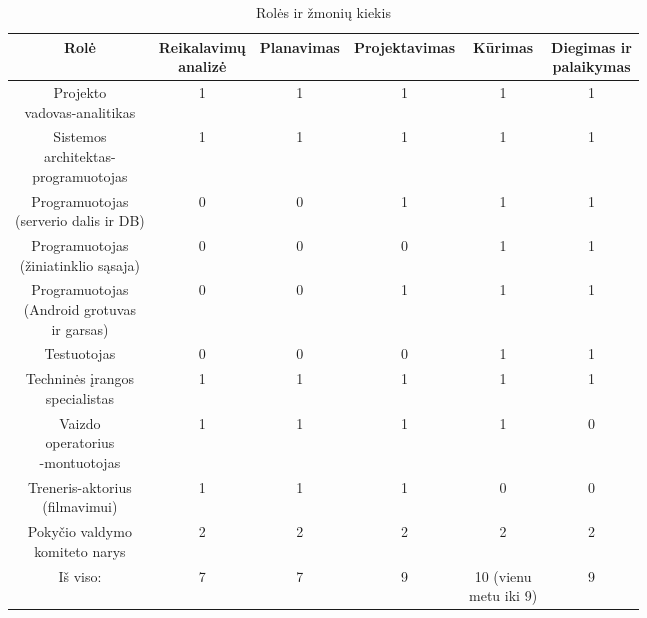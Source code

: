 \begin{table}[h]
    \centering
    \small
    \begin{tabular}{cccccc}
    \hline
        Rolė  & \makecell{Reikalavimų \\ analizė}  & Planavimas & Projektavimas & Kūrimas & \makecell{Diegimas ir  \\ palaikymas} \\
        \hline
        \makecell{Projekto \\vadovas-analitikas} & 1 & 1 & 1 & 1 & 1  \\
        \makecell{Sistemos\\ architektas- \\programuotojas} & 1 & 1 & 1 & 1 & 1 \\
        
        
        \makecell{Programuotojas \\ (serverio dalis ir DB)}   & 0 & 0 & 1 & 1 & 1 \\
        

        \makecell{Programuotojas\\ (žiniatinklio sąsaja)} & 0 & 0 & 0 & 1 & 1 \\
        

        \makecell{Programuotojas \\ (Android grotuvas \\ir garsas)} & 0 & 0 & 1 & 1 & 1 \\
        

        \makecell{Testuotojas \\ } & 0 & 0 & 0 & 1  & 1 \\
        

        \makecell{Techninės įrangos \\ specialistas}  & 1 & 1 & 1 & 1 & 1 \\
        

        \makecell{Vaizdo \\ operatorius\\-montuotojas} & 1 & 1 & 1 & 1 & 0  \\
        

        \makecell{Treneris-aktorius \\ (filmavimui)}   & 1 & 1  & 1 & 0 & 0 \\

        \makecell{Pokyčio valdymo \\ komiteto narys} & 2 & 2 & 2 & 2 & 2 \\
        \hline


        Iš viso: & 7 & 7 & 9 & \makecell{10 (vienu \\ metu iki 9)} & 9 \\
        \hline
        
    
    \end{tabular}
    \caption{Rolės ir žmonių kiekis}
    \label{tab:roles-laikotarpiai}
\end{table}

